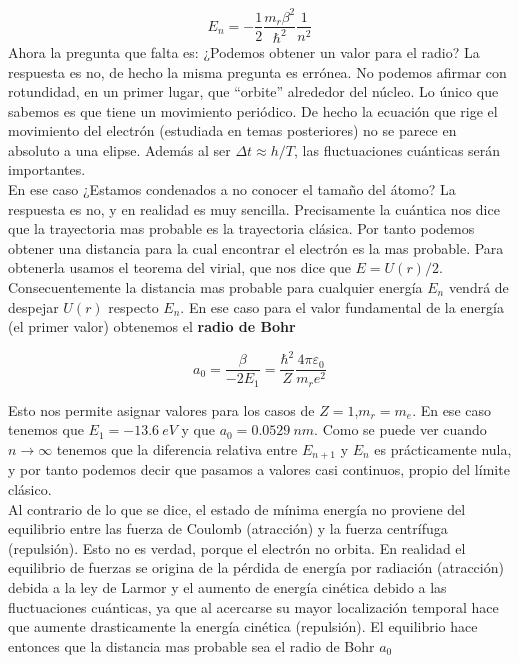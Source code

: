 \documentclass[12pt]{article}
\begin{document}
\begin{equation}
E_n = - \dfrac{1}{2} \dfrac{m_r \beta^2}{\hbar^2} \dfrac{1}{n^2}
\end{equation}
Ahora la pregunta que falta es: ¿Podemos obtener un valor para el radio? La respuesta es no, de hecho la misma pregunta es errónea. No podemos afirmar con rotundidad, en un primer lugar, que ``orbite'' alrededor del núcleo. Lo único que sabemos es que tiene un movimiento periódico. De hecho la ecuación que rige el movimiento del electrón (estudiada en temas posteriores) no se parece en absoluto a una elipse. Además al ser $\Delta t \approx h/T$, las fluctuaciones cuánticas serán importantes. \\

En ese caso ¿Estamos condenados a no conocer el tamaño del átomo? La respuesta es no, y en realidad es muy sencilla. Precisamente la cuántica nos dice que la trayectoria mas probable es la trayectoria clásica. Por tanto podemos obtener una distancia para la cual encontrar el electrón es la mas probable. Para obtenerla usamos el teorema del virial, que nos dice que $E = U(r)/2$. Consecuentemente la distancia mas probable para cualquier energía $E_n$ vendrá de despejar $U(r)$ respecto $E_n$. En ese caso para el valor fundamental de la energía (el primer valor) obtenemos el \textbf{radio de Bohr}

\begin{equation}
a_0 = \dfrac{\beta}{- 2 E_1} = \dfrac{\hbar^2}{Z} \dfrac{4 \pi \varepsilon_0}{m_r e^2}
\end{equation}

Esto nos permite asignar valores para los casos de $Z=1$,$m_r = m_e$. En ese caso tenemos que $E_1 = -13.6 \ eV$ y que $a_0 = 0.0529 \ nm$. Como se puede ver cuando $n \rightarrow \infty$ tenemos que la diferencia relativa entre $E_{n+1}$ y $E_n$ es prácticamente nula, y por tanto podemos decir que pasamos a valores casi continuos, propio del límite clásico. \\

Al contrario de lo que se dice, el estado de mínima energía no proviene del equilibrio entre las fuerza de Coulomb (atracción) y la fuerza centrífuga (repulsión). Esto no es verdad, porque el electrón no orbita. En realidad el equilibrio de fuerzas se origina de la pérdida de energía por radiación (atracción) debida a la ley de Larmor y el aumento de energía cinética debido a las fluctuaciones cuánticas, ya que al acercarse su mayor localización temporal hace que aumente drasticamente la energía cinética (repulsión). El equilibrio hace entonces que la distancia mas probable sea el radio de Bohr $a_0$   \\
\end{document}
